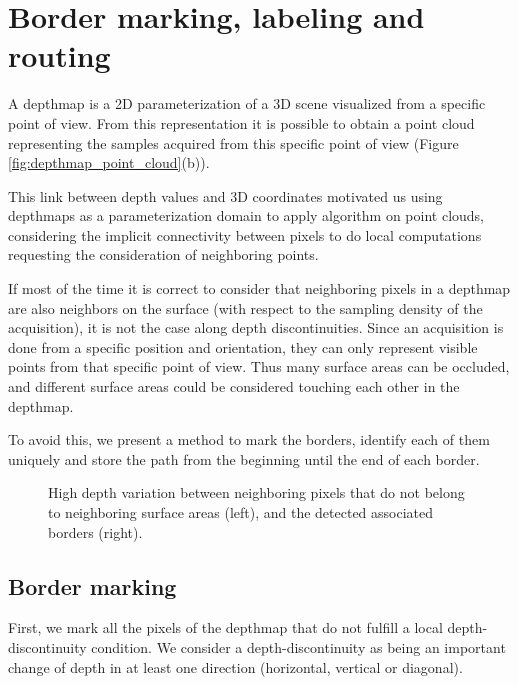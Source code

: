 \documentclass[11pt,fleqn]{book} %
\begin{document}
\section{Border marking, labeling and routing}
\label{sec:border_marking}

A depthmap is a 2D parameterization of a 3D scene visualized from a specific point of view. From this representation it is possible to obtain a point cloud representing the samples acquired from this specific point of view (Figure \ref{fig:depthmap_point_cloud}(b)).

This link between depth values and 3D coordinates motivated us using depthmaps as a parameterization domain to apply algorithm on point clouds, considering the implicit connectivity between pixels to do local computations requesting the consideration of neighboring points.

If most of the time it is correct to consider that neighboring pixels in a depthmap are also neighbors on the surface (with respect to the sampling density of the acquisition), it is not the case along depth discontinuities.
Since an acquisition is done from a specific position and orientation, they can only represent visible points from that specific point of view. 
Thus many surface areas can be occluded, and different surface areas could be considered touching each other in the depthmap.

To avoid this, we present a method to mark the borders, identify each of them uniquely and store the path from the beginning until the end of each border.

\begin{figure}
\centering
{}
\caption{High depth variation between neighboring pixels that do not belong to neighboring surface areas (left), and the detected associated borders (right).}
\label{fig:depth_discontinuity}
\end{figure}

\subsection{Border marking}
First, we mark all the pixels of the depthmap that do not fulfill a local depth-discontinuity condition. We consider a depth-discontinuity as being an important change of depth in at least one direction (horizontal, vertical or diagonal).
\end{document}
